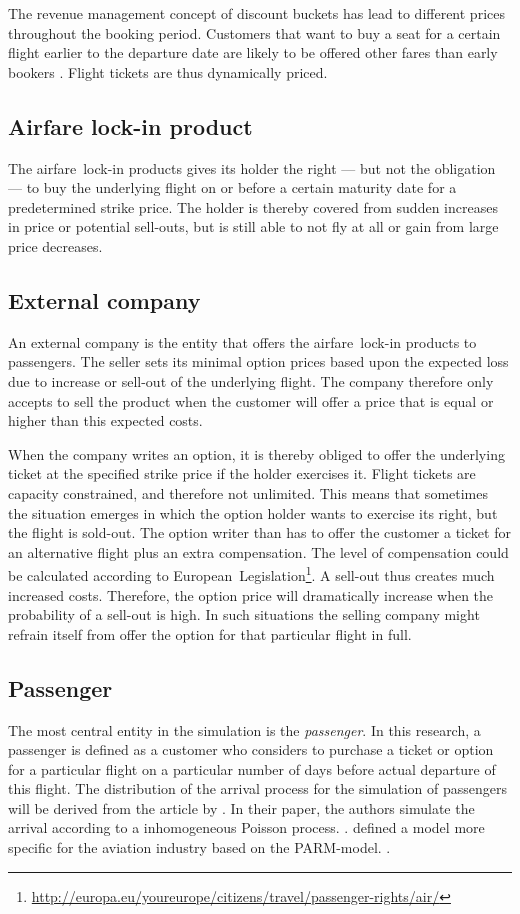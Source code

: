 The revenue management concept of discount buckets has lead to different prices throughout the booking period. Customers that want to buy a seat for a certain flight earlier to the departure date are likely to be offered other fares than early bookers . Flight tickets are thus dynamically priced.

\subsection{Airfare lock-in product}
The airfare~lock-in products gives its holder the right --- but not the obligation --- to buy the underlying flight on or before a certain maturity date for a predetermined strike price. The holder is thereby covered from sudden increases in price or potential sell-outs, but is still able to not fly at all or gain from large price decreases.

\subsection{External company}
An external company is the entity that offers the airfare~lock-in products to passengers. The seller sets its minimal option prices based upon the expected loss due to increase or sell-out of the underlying flight. The company therefore only accepts to sell the product when the customer will offer a price that is equal or higher than this expected costs.

When the company writes an option, it is thereby obliged to offer the underlying ticket at the specified strike price if the holder exercises it. Flight tickets are capacity constrained, and therefore not unlimited. This means that sometimes the situation emerges in which the option holder wants to exercise its right, but the flight is sold-out. The option writer than has to offer the customer a ticket for an alternative flight plus an extra compensation. The level of compensation could be calculated according to European~Legislation\footnote{\url{http://europa.eu/youreurope/citizens/travel/passenger-rights/air/}}. A sell-out thus creates much increased costs. Therefore, the option price will dramatically increase when the probability of a sell-out is high. In such situations the selling company might refrain itself from offer the option for that particular flight in full.

\subsection{Passenger}
\label{sec:Passenger}
The most central entity in the simulation is the \emph{passenger}.  In this research, a passenger is defined as a customer who considers to purchase a ticket or option for a particular flight on a particular number of days before actual departure of this flight. The distribution of the arrival process for the simulation of passengers will be derived from the article by . In their paper, the authors simulate the arrival according to a inhomogeneous Poisson process. .  defined a model more specific for the aviation industry based on the PARM-model. .

